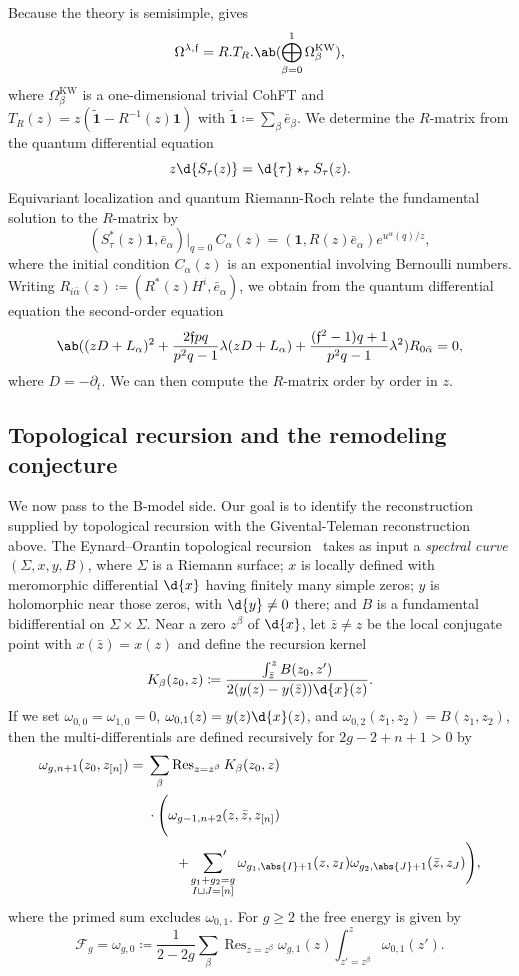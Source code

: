 \documentclass{amsart}
\theoremstyle{definition}
\theoremstyle{remark}
\theoremstyle{plain}
\theoremstyle{definition}
\theoremstyle{remark}
\newcommand{\mc}[1]{\mathcal{#1}}
\newcommand{\mf}[1]{\mathfrak{#1}}
\newcommand{\mr}[1]{\mathrm{#1}}
\newcommand{\on}[1]{\operatorname{#1}}
\newcommand{\wt}[1]{\widetilde{#1}}
\newcommand{\1}{\mathbf{1}}
\newcommand{\2}{\mathbf{2}}
\newcommand{\3}{\mathbf{3}}
\begin{document}
Because the theory is semisimple,  gives
\[ \Omega^{\lambda,\mf{f}} = R.T_R.\ab(\bigoplus_{\beta=0}^1 \Omega^{\mr{KW}}_{\beta}), \]
where \(\Omega^{\mr{KW}}_{\beta}\) is a one-dimensional trivial CohFT and \(T_R(z) = z(\wt{\1}-R^{-1}(z)\1)\) with \(\wt{\1} \coloneqq \sum_{\beta}\bar{e}_{\beta}\). We determine the \(R\)-matrix from the quantum differential equation
\[ z \d{S_{\tau}(z)} = \d{\tau} \star_{\tau} S_{\tau}(z). \]
Equivariant localization and quantum Riemann-Roch relate the fundamental solution to the \(R\)-matrix by
\[ (S^*_{\tau}(z)\1, \bar{e}_{\alpha})\big|_{q=0}\, C_{\alpha}(z) = (\1, R(z)\bar{e}_{\alpha})e^{u^{\alpha}(q)/z}, \]
where the initial condition \(C_{\alpha}(z)\) is an exponential involving Bernoulli numbers. Writing \(R_{i\bar{\alpha}}(z) \coloneqq (R^*(z)H^i, \bar{e}_{\alpha})\), we obtain from the quantum differential equation the second-order equation
\[ \ab( (zD+L_{\alpha})^2 + \frac{2\mf{f}pq}{p^2q-1}\lambda(zD+L_{\alpha}) + \frac{(\mf{f}^2-1)q+1}{p^2q-1}\lambda^2 )R_{0\bar{\alpha}} = 0, \]
where \(D = -\partial_t\). We can then compute the \(R\)-matrix order by order in \(z\).

\subsection{Topological recursion and the remodeling conjecture}%
\label{sub:Topological recursion and the remodeling conjecture}

We now pass to the B-model side. Our goal is to identify the reconstruction supplied by topological recursion with the Givental-Teleman reconstruction above. The Eynard--Orantin topological recursion~\cite{EO2007} takes as input a \textit{spectral curve} \((\Sigma,x,y,B)\), where \(\Sigma\) is a Riemann surface; \(x\) is locally defined with meromorphic differential \(\d{x}\) having finitely many simple zeros; \(y\) is holomorphic near those zeros, with \(\d{y} \neq 0\) there; and \(B\) is a fundamental bidifferential on \(\Sigma \times \Sigma\). Near a zero \(z^{\beta}\) of \(\d{x}\), let \(\bar{z} \neq z\) be the local conjugate point with \(x(\bar{z}) = x(z)\) and define the recursion kernel
\[ K_{\beta}(z_0,z) \coloneqq \frac{\int_{\bar{z}}^z B(z_0,z')}{2(y(z)-y(\bar{z}))\d{x}(z)}. \]
If we set \(\omega_{0,0} = \omega_{1,0} = 0\), \(\omega_{0,1}(z) = y(z)\d{x}(z)\), and \(\omega_{0,2}(z_1,z_2) = B(z_1,z_2)\), then the multi-differentials are defined recursively for \(2g-2+n+1 > 0\) by
\begin{align*}
    \omega_{g,n+1}(z_0,z_{[n]}) ={}& \sum_{\beta}\on{Res}_{z = z^{\beta}} K_{\beta}(z_0,z) \\
    &\cdot \Bigg( \omega_{g-1,n+2}(z,\bar{z},z_{[n]}) \\
    &\qquad + \sideset{}{'}\sum_{\substack{g_1+g_2 = g \\ I \sqcup J = [n]}}\omega_{g_1,\abs{I}+1}(z,z_I)\omega_{g_2,\abs{J}+1}(\bar{z},z_J)\Bigg),
\end{align*}
where the primed sum excludes \(\omega_{0,1}\). For \(g \geq 2\) the free energy is given by
\[ \mc{F}_g = \omega_{g,0} \coloneqq \frac{1}{2-2g}\sum_{\beta}\on{Res}_{z=z^{\beta}}\omega_{g,1}(z)\int_{z'=z^{\beta}}^z \omega_{0,1}(z'). \]
\end{document}
